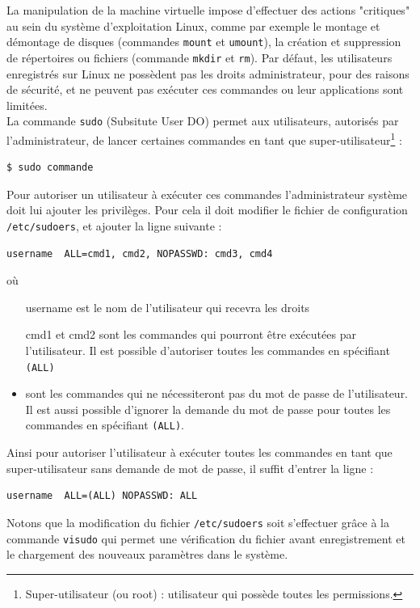 La manipulation de la machine virtuelle impose d'effectuer des actions "critiques" au sein du système d'exploitation Linux, comme par exemple le montage et démontage de disques (commandes \lstinline{mount} et \lstinline{umount}), la création et suppression de répertoires ou fichiers (commande \lstinline{mkdir} et \lstinline{rm}).
Par défaut, les utilisateurs enregistrés sur Linux ne possèdent pas les droits administrateur, pour des raisons de sécurité, et ne peuvent pas exécuter ces commandes ou leur applications sont limitées.
\\


La commande \lstinline{sudo} (Subsitute User DO) permet aux utilisateurs, autorisés par l'administrateur, de lancer certaines commandes en tant que super-utilisateur\footnote{Super-utilisateur (ou root) : utilisateur qui possède toutes les permissions.} :
\begin{lstlisting}[language = sh]
$ sudo commande
\end{lstlisting}

Pour autoriser un utilisateur à exécuter ces commandes l'administrateur système doit lui ajouter les privilèges.
Pour cela il doit modifier le fichier de configuration \lstinline{/etc/sudoers}, et ajouter la ligne suivante :
\begin{lstlisting}
username  ALL=cmd1, cmd2, NOPASSWD: cmd3, cmd4
\end{lstlisting}
où
\begin{itemize}
	\item[username] est le nom de l'utilisateur qui recevra les droits
	\item[cmd1 et cmd2] sont les commandes qui pourront être exécutées par l'utilisateur. Il est possible d'autoriser toutes les commandes en spécifiant \lstinline{(ALL)}
	\item[cmd3 et cmd4] sont les commandes qui ne nécessiteront pas du mot de passe de l'utilisateur. Il est aussi possible d'ignorer la demande du mot de passe pour toutes les commandes en spécifiant \lstinline{(ALL)}.
\end{itemize}

Ainsi pour autoriser l'utilisateur à exécuter toutes les commandes en tant que super-utilisateur sans demande de mot de passe, il suffit d'entrer la ligne :
\begin{lstlisting}
username  ALL=(ALL) NOPASSWD: ALL
\end{lstlisting}

Notons que la modification du fichier \lstinline{/etc/sudoers} soit s'effectuer grâce à la commande \lstinline{visudo} qui permet une vérification du fichier avant enregistrement et le chargement des nouveaux paramètres dans le système.
~~\\



